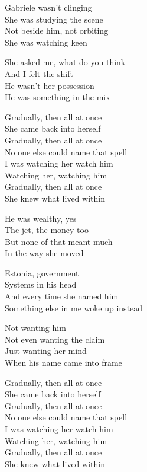 \begin{lyrics}
Gabriele wasn’t clinging\\
She was studying the scene\\
Not beside him, not orbiting\\
She was watching keen

She asked me, what do you think\\
And I felt the shift\\
He wasn’t her possession\\
He was something in the mix

Gradually, then all at once\\
She came back into herself\\
Gradually, then all at once\\
No one else could name that spell\\
I was watching her watch him\\
Watching her, watching him\\
Gradually, then all at once\\
She knew what lived within

He was wealthy, yes\\
The jet, the money too\\
But none of that meant much\\
In the way she moved

Estonia, government\\
Systems in his head\\
And every time she named him\\
Something else in me woke up instead

Not wanting him\\
Not even wanting the claim\\
Just wanting her mind\\
When his name came into frame

Gradually, then all at once\\
She came back into herself\\
Gradually, then all at once\\
No one else could name that spell\\
I was watching her watch him\\
Watching her, watching him\\
Gradually, then all at once\\
She knew what lived within
\end{lyrics}

